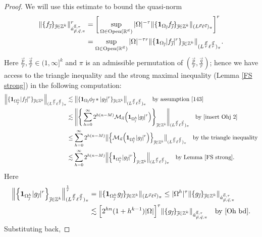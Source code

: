\documentclass[11pt, reqno]{amsart}
\theoremstyle{definition}
\theoremstyle{remark}
\numberwithin{equation}{section}
\newcommand{\R}{\mathbb R}
\newcommand{\Z}{\mathbb Z}
\newcommand{\vnull}{\vec 0}
\newcommand{\vj}{\vec{\textit{\j}}}
\newcommand{\vn}{\vec n}
\newcommand{\vp}{\vec p}
\newcommand{\vq}{\vec q}
\newcommand{\antau}{\dot a^{\vnull,\tau}_{\vp,\vq,\pi}}
\newcommand{\one}{\mathbf{1}}
\newcommand{\abs}[1]{|#1|}
\newcommand{\Norm}[2]{\|#1\|_{#2}}
\newcommand{\bNorm}[2]{\big\|#1\big\|_{#2}}
\newcommand{\Open}{\mathrm{Open}}
\begin{document}
\begin{proof}
We will use this estimate to bound the quasi-norm
\begin{equation*}
\begin{split}
\Norm{\{f_{\vj}\}_{\vj\in\Z^k}}{\antau}^r
&=\bigg[\sup_{\Omega\in\Open(\R^{\vn})}\abs{\Omega}^{-\tau}
\Norm{\{\one_{\Omega_{\vj}}f_{\vj}\}_{\vj\in\Z^k}}{(L^{\vp}\ell^{\vq})_\pi}\bigg]^r\\
&=\sup_{\Omega\in\Open(\R^{\vn})}\abs{\Omega}^{-\tau r}
\Norm{\{\one_{\Omega_{\vj}}\abs{f_{\vj}}^r \}_{\vj\in\Z^k}}{(L^{\frac{\vp}r}\ell^{\frac{\vq}r})_\pi}.
\end{split}
\end{equation*}
Here $\frac{\vp}r,\frac{\vq}r\in(1,\infty]^k$ and $\pi$ is an admissible permutation of $( \frac{\vp}r, \frac{\vq}r )$; hence we have access to the triangle inequality and the strong maximal inequality (Lemma \ref{FS strong}) in the following computation:
\begin{align*}
\Big\|\{\one_{\Omega^h_{\vj}}\abs{f_{\vj}}^r\}_{\vj\in\Z^k}
\Big\|_{(L^{\frac{\vp}r}\ell^{\frac{\vq}r})_\pi}
&\lesssim\bNorm{\{\one_{\Omega_{\vj}}\phi_{\vj}*\abs{g_{\vj}}^r \}_{\vj\in\Z^k}}{(L^{\frac{\vp}r}\ell^{\frac{\vq}r})_\pi}
\quad\text{by assumption \eqref{143}} \\
&\lesssim\Bigg\|\Bigg\{\sum_{h=0}^\infty 2^{h(n-M)} \mathcal M_{\vn}\Big(\one_{\Omega^h_{\vj}}\abs{g_{\vj}}^r\Big)\Bigg\}_{\vj\in\Z^k} \Bigg\|_{(L^{\frac{\vp}r}\ell^{\frac{\vq}r})_\pi}
\quad\text{by \eqref{insert Ohj 2}} \\
&\leq \sum_{h=0}^\infty 2^{h(n-M)}\bNorm{\Big\{\mathcal M_{\vn}\Big(\one_{\Omega^h_{\vj}}\abs{g_{\vj}}^r\Big)\Big\}_{\vj\in\Z^k} }{(L^{\frac{\vp}r}\ell^{\frac{\vq}r})_\pi}
\quad\text{by the triangle inequality} \\
&\lesssim \sum_{h=0}^\infty 2^{h(n-M)}
\Big\|\Big\{\one_{\Omega^h_{\vj}}\abs{g_{\vj}}^r\Big\}_{\vj\in\Z^k}
\Big\|_{(L^{\frac{\vp}r}\ell^{\frac{\vq}r})_\pi}\quad\text{by Lemma \ref{FS strong}}.
\end{align*}
Here
\begin{align*}
\Big\|\Big\{\one_{\Omega^h_{\vj}}\abs{g_{\vj}}^r\Big\}_{\vj\in\Z^k}
\Big\|_{(L^{\frac{\vp}r}\ell^{\frac{\vq}r})_\pi}^{\frac 1r}
&=\Norm{\{\one_{\Omega^h_{\vj}}g_{\vj}\}_{\vj\in\Z^k} }{(L^{\vp}\ell^{\vq})_\pi}
\leq\abs{\Omega^h}^\tau\Norm{\{g_{\vj}\}_{\vj\in\Z^k}}{\antau} \\
&\lesssim \Big[ 2^{hn}(1+h^{k-1})\abs{\Omega}\Big]^{\tau}
\Norm{\{g_{\vj}\}_{\vj\in\Z^k}}{\antau}\quad\text{by \eqref{Oh bd}}.
\end{align*}
Substituting back,

\end{proof}
\end{document}
